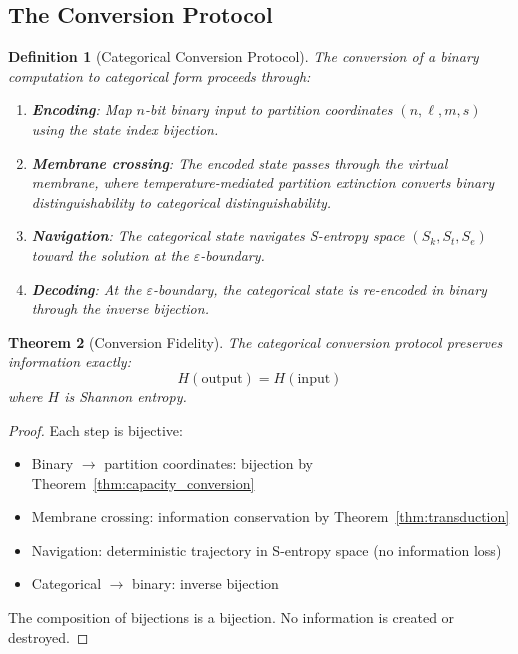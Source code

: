 \documentclass[twocolumn,10pt]{article}
\newtheorem{theorem}{Theorem}[section]
\newtheorem{definition}[theorem]{Definition}
\theoremstyle{remark}
\newcommand{\Sk}{S_k}
\newcommand{\St}{S_t}
\newcommand{\Se}{S_e}
\newcommand{\eps}{\varepsilon}
\begin{document}
\subsection{The Conversion Protocol}

\begin{definition}[Categorical Conversion Protocol]
\label{def:protocol}
The conversion of a binary computation to categorical form proceeds through:
\begin{enumerate}
    \item \textbf{Encoding}: Map $n$-bit binary input to partition coordinates $(n, \ell, m, s)$ using the state index bijection.
    \item \textbf{Membrane crossing}: The encoded state passes through the virtual membrane, where temperature-mediated partition extinction converts binary distinguishability to categorical distinguishability.
    \item \textbf{Navigation}: The categorical state navigates S-entropy space $(\Sk, \St, \Se)$ toward the solution at the $\eps$-boundary.
    \item \textbf{Decoding}: At the $\eps$-boundary, the categorical state is re-encoded in binary through the inverse bijection.
\end{enumerate}
\end{definition}

\begin{theorem}[Conversion Fidelity]
\label{thm:fidelity}
The categorical conversion protocol preserves information exactly:
\begin{equation}
    H(\text{output}) = H(\text{input})
\end{equation}
where $H$ is Shannon entropy.
\end{theorem}

\begin{proof}
Each step is bijective:
\begin{itemize}
    \item Binary $\to$ partition coordinates: bijection by Theorem~\ref{thm:capacity_conversion}
    \item Membrane crossing: information conservation by Theorem~\ref{thm:transduction}
    \item Navigation: deterministic trajectory in S-entropy space (no information loss)
    \item Categorical $\to$ binary: inverse bijection
\end{itemize}

The composition of bijections is a bijection. No information is created or destroyed.
\end{proof}
\end{document}
